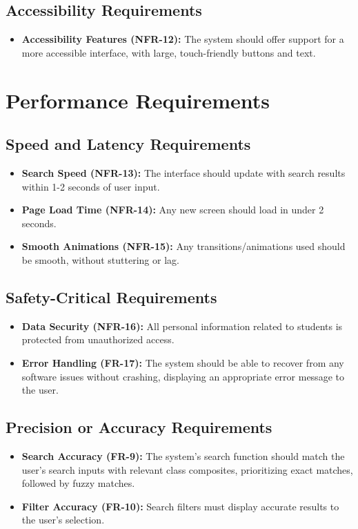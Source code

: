 \documentclass[12pt]{article}
\begin{document}
\subsection{Accessibility Requirements}
\begin{itemize}
    \item \textbf{Accessibility Features (NFR-12):} The system should offer support for a more accessible interface, with large, touch-friendly buttons and text.
\end{itemize}


\section{Performance Requirements}

\subsection{Speed and Latency Requirements}
\begin{itemize}
    \item \textbf{Search Speed (NFR-13):} The interface should update with search results within 1-2 seconds of user input.
    \item \textbf{Page Load Time (NFR-14):} Any new screen should load in under 2 seconds.
    \item \textbf{Smooth Animations (NFR-15):} Any transitions/animations used should be smooth, without stuttering or lag.
\end{itemize}

\subsection{Safety-Critical Requirements}
\begin{itemize}
    \item \textbf{Data Security (NFR-16):} All personal information related to students is protected from unauthorized access.
    \item \textbf{Error Handling (FR-17):} The system should be able to recover from any software issues without crashing, displaying an appropriate error message to the user.
\end{itemize}

\subsection{Precision or Accuracy Requirements}
\begin{itemize}
    \item \textbf{Search Accuracy (FR-9):} The system’s search function should match the user’s search inputs with relevant class composites, prioritizing exact matches, followed by fuzzy matches.
    \item \textbf{Filter Accuracy (FR-10):} Search filters must display accurate results to the user’s selection.
\end{itemize}
\end{document}
